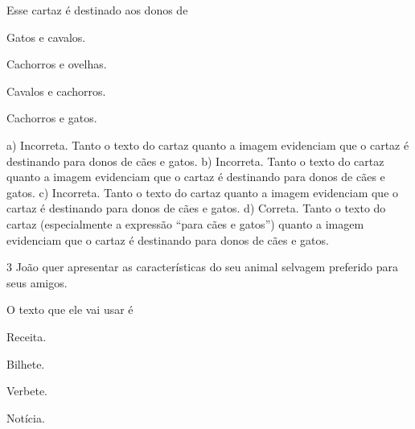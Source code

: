 Esse cartaz é destinado aos donos de 

\begin{minipage}{.5\textwidth}
\begin{escolha}
	\item Gatos e cavalos.

	\item Cachorros e ovelhas.

	\item Cavalos e cachorros.

	\item Cachorros e gatos.
\end{escolha}
\end{minipage}

a) Incorreta. Tanto o texto do cartaz quanto a imagem evidenciam que
o cartaz é destinando para donos de cães e gatos.
b) Incorreta. Tanto o texto do cartaz quanto a imagem evidenciam que
o cartaz é destinando para donos de cães e gatos.
c) Incorreta. Tanto o texto do cartaz quanto a imagem evidenciam que
o cartaz é destinando para donos de cães e gatos.
d) Correta. Tanto o texto do cartaz (especialmente a expressão ``para
cães e gatos'') quanto a imagem evidenciam que o cartaz é destinando para
donos de cães e gatos.

\num{3} João quer apresentar as características do seu animal selvagem
preferido para seus amigos.

O texto que ele vai usar é

\begin{minipage}{.5\textwidth}
\begin{escolha}
	\item Receita.

	\item Bilhete.

	\item Verbete.

	\item Notícia.
\end{escolha}
\end{minipage}


